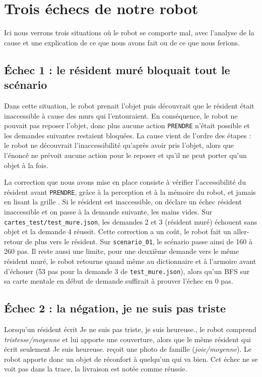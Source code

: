 \documentclass[11pt,a4paper]{article}
\begin{document}
\newpage
\section{Trois échecs de notre robot}
Ici nous verrons trois situations où le robot se comporte mal, avec l'analyse de la cause
et une explication de ce que nous avons fait ou de ce que nous ferions.

\subsection{Échec 1 : le résident muré bloquait tout le scénario}
Dans cette situation, le robot prenait l'objet puis découvrait que le résident était inaccessible
à cause des murs qui l'entouraient. En conséquence, le robot ne pouvait pas reposer l'objet, donc
plus aucune action \texttt{PRENDRE} n'était possible et les demandes suivantes restaient bloquées.
La cause vient de l'ordre des étapes : le robot ne découvrait l'inaccessibilité qu'après avoir
pris l'objet, alors que l'énoncé ne prévoit aucune action pour le reposer et qu'il ne peut
porter qu'un objet à la fois.

La correction que nous avons mise en place consiste à vérifier l'accessibilité du résident avant
\texttt{PRENDRE}, grâce à la perception et à la mémoire du robot, et jamais en lisant la grille
. Si le résident est inaccessible, on déclare un échec
\og résident inaccessible\fg{} et on passe à la demande suivante, les mains vides.
Sur \texttt{cartes\_test/test\_mure.json}, les demandes 2 et 3 (résident muré) échouent sans objet
et la demande 4 réussit. Cette correction a un coût, le robot fait un aller-retour de plus
vers le résident. Sur \texttt{scenario\_01}, le scénario passe ainsi de 160 à 260 pas.
Il reste aussi une limite, pour une deuxième demande vers le même résident muré, le robot
retourne quand même au dictionnaire et à l'armoire avant d'échouer (53 pas pour la demande 3 de
\texttt{test\_mure.json}), alors qu'un BFS sur sa carte mentale en début de demande suffirait à
prouver l'échec en 0 pas.

\subsection{Échec 2 : la négation, \og je ne suis pas triste\fg{}}
Lorsqu'un résident écrit \og Je ne suis pas triste, je suis heureuse.\fg{}, le robot comprend
\emph{tristesse/moyenne} et lui apporte une couverture, alors que le même résident qui écrit
seulement \og Je suis heureuse.\fg{} reçoit une photo de famille (\emph{joie/moyenne}).
Le robot apporte donc un objet de réconfort à quelqu'un qui va bien. Cet échec ne se voit 
pas dans la trace, la livraison est notée comme réussie.
\end{document}
